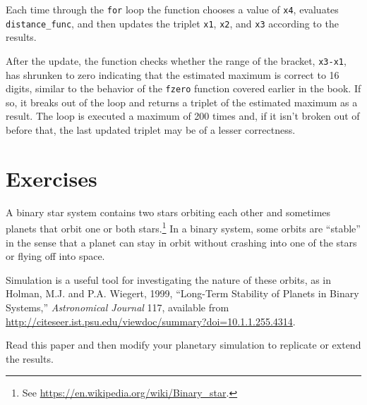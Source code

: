 \documentclass[
]{book}
\numberwithin{Answer}{chapter}
\numberwithin{Exercise}{chapter}
\begin{document}
Each time through the {\tt for} loop the function chooses a value
of {\tt x4}, evaluates {\tt distance\_func}, and then updates the
triplet {\tt x1}, {\tt x2}, and {\tt x3} according to the results.

After the update, 
the function checks whether the range of the bracket, {\tt x3-x1}, has 
shrunken to zero indicating that the estimated maximum is correct to 16 
digits, similar to the behavior of the {\tt fzero} function covered earlier
in the book. 
If so, it breaks out of
the loop and returns a triplet of the estimated maximum as a result.  
The loop is executed a maximum of 200 times and, if it isn't broken
out of before that, the last updated triplet may be of a lesser
correctness.


\section{Exercises}

\begin{ex}
\label{ex:binary}

A binary star system contains two stars orbiting each other and
sometimes planets that orbit one or both stars.\footnote{See
\url{https://en.wikipedia.org/wiki/Binary_star}.}  In a binary
system, some orbits are ``stable'' in the sense that a planet can stay
in orbit without crashing into one of the stars or flying off into
space.

Simulation is a useful tool for investigating the nature of these
orbits, as in Holman, M.J. and P.A. Wiegert, 1999, ``Long-Term Stability
of Planets in Binary Systems,''  {\em Astronomical Journal} 117,
available from \url{http://citeseer.ist.psu.edu/viewdoc/summary?doi=10.1.1.255.4314}.

Read this paper and then modify your planetary simulation to
replicate or extend the results.
\end{ex}
\end{document}
